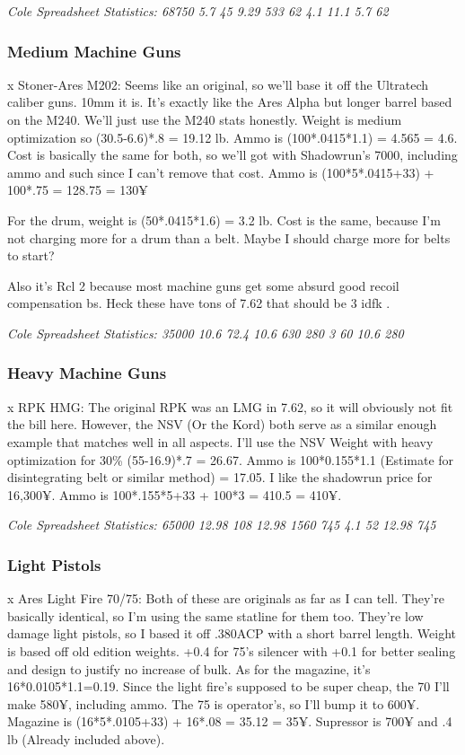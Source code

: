 \begin{multicols*}{2}
	\textit{\textcolor{OliveGreen}{Cole Spreadsheet Statistics: 68750 5.7 45 9.29 533 62 4.1 11.1 5.7 62}}
	
	\subsubsection{Medium Machine Guns}
	
	x Stoner-Ares M202: Seems like an original, so we'll base it off the Ultratech caliber guns. 10mm it is. It's exactly like the Ares Alpha but longer barrel based on the M240. We'll just use the M240 stats honestly. Weight is medium optimization so (30.5-6.6)*.8 = 19.12 lb. Ammo is (100*.0415*1.1) = 4.565 = 4.6. Cost is basically the same for both, so we'll got with Shadowrun's 7000, including ammo and such since I can't remove that cost. Ammo is (100*5*.0415+33) + 100*.75 = 128.75 = 130¥
	
	For the drum, weight is (50*.0415*1.6) = 3.2 lb. Cost is the same, because I'm not charging more for a drum than a belt. Maybe I should charge more for belts to start?
	
	Also it's Rcl 2 because most machine guns get some absurd good recoil compensation bs. Heck these have tons of 7.62 that should be 3 idfk \GURPS.
	
	\textit{\textcolor{OliveGreen}{Cole Spreadsheet Statistics: 35000 10.6 72.4 10.6 630 280 3 60 10.6 280}}
	
	\subsubsection{Heavy Machine Guns}
	
	x RPK HMG: The original RPK was an LMG in 7.62, so it will obviously not fit the bill here. However, the NSV (Or the Kord) both serve as a similar enough example that matches well in all aspects. I'll use the NSV Weight with heavy optimization for 30\% (55-16.9)*.7 = 26.67. Ammo is  100*0.155*1.1 (Estimate for disintegrating belt or similar method) = 17.05. I like the shadowrun price for 16,300¥. Ammo is 100*.155*5+33 + 100*3 = 410.5 = 410¥.
	
	\textit{\textcolor{OliveGreen}{Cole Spreadsheet Statistics: 65000 12.98 108 12.98 1560 745 4.1 52 12.98 745}}
	
	\subsubsection{Light Pistols}
	
	x Ares Light Fire 70/75: Both of these are originals as far as I can tell. They're basically identical, so I'm using the same statline for them too. They're low damage light pistols, so I based it off .380ACP with a short barrel length. Weight is based off old edition weights.  +0.4 for 75's silencer with +0.1 for better sealing and design to justify no increase of bulk. As for the magazine, it's 16*0.0105*1.1=0.19. Since the light fire's supposed to be super cheap, the 70 I'll make 580¥, including ammo. The 75 is operator's, so I'll bump it to 600¥. Magazine is (16*5*.0105+33) + 16*.08 = 35.12 = 35¥. Supressor is 700¥ and .4 lb (Already included above).
	

\end{multicols*}
